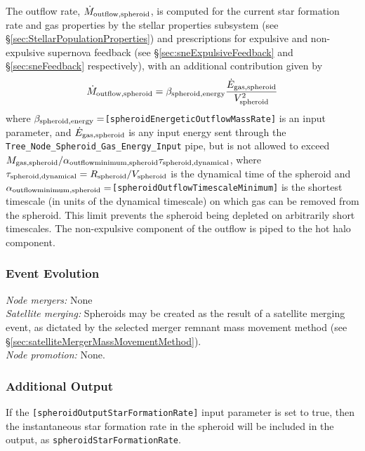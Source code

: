 The outflow rate, $\dot{M}_{\rm outflow, spheroid}$, is computed for the current star formation rate and gas properties by the stellar properties subsystem (see \S\ref{sec:StellarPopulationProperties}) and prescriptions for expulsive and non-expulsive supernova feedback (see \S\ref{sec:sneExpulsiveFeedback} and \S\ref{sec:sneFeedback} respectively), with an additional contribution given by
\begin{equation}
 \dot{M}_{\rm outflow, spheroid} = \beta_{\rm spheroid, energy} {\dot{E}_{\rm gas, spheroid} \over V_{\rm spheroid}^2}
\end{equation}
where $\beta_{\rm spheroid, energy}=${\tt [spheroidEnergeticOutflowMassRate]} is an input parameter, and $\dot{E}_{\rm gas,spheroid}$ is any input energy sent through the {\tt Tree\_Node\_Spheroid\_Gas\_Energy\_Input} pipe, but is not allowed to exceed $M_{\rm gas, spheroid}/ \alpha_{\rm outflow minimum, spheroid} \tau_{\rm spheroid, dynamical}$, where $\tau_{\rm spheroid, dynamical}=R_{\rm spheroid}/V_{\rm spheroid}$ is the dynamical time of the spheroid and $\alpha_{\rm outflow minimum, spheroid}=${\tt [spheroidOutflowTimescaleMinimum]} is the shortest timescale (in units of the dynamical timescale) on which gas can be removed from the spheroid. This limit prevents the spheroid being depleted on arbitrarily short timescales. The non-expulsive \gls{component} of the outflow is piped to the hot halo component.

\subsubsection{Event Evolution}

\noindent\emph{Node mergers:} None\\

\noindent\emph{Satellite merging:} Spheroids may be created as the result of a satellite merging event, as dictated by the selected merger remnant mass movement method (see \S\ref{sec:satelliteMergerMassMovementMethod}).\\

\noindent\emph{Node promotion:} None.\\

\subsubsection{Additional Output}

If the {\tt [spheroidOutputStarFormationRate]} input parameter is set to true, then the instantaneous star formation rate in the spheroid will be included in the output, as {\tt spheroidStarFormationRate}.


